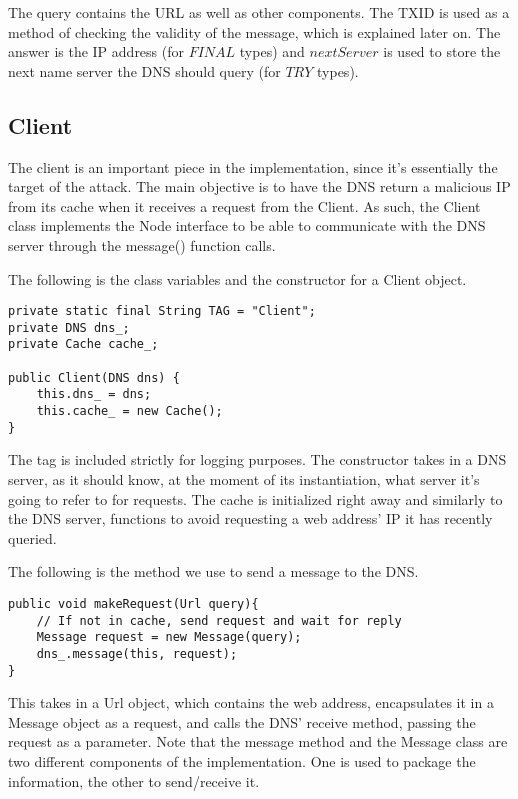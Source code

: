 \documentclass[a4paper, 12pt]{article} %
\begin{document}
The query contains the URL as well as other components. The TXID is used as a method of checking the validity of the message, which is explained later on. The answer is the IP address (for $FINAL$ types) and $nextServer$ is used to store the next name server the DNS should query (for $TRY$ types).

\subsection*{Client}

The client is an important piece in the implementation, since it's essentially the target of the attack. The main objective is to have the DNS return a malicious IP from its cache when it receives a request from the Client. As such, the Client class implements the Node interface to be able to communicate with the DNS server through the message() function calls. 

The following is the class variables and the constructor for a Client object.

\begin{lstlisting}
private static final String TAG = "Client";	
private DNS dns_;
private Cache cache_;
    	
public Client(DNS dns) {
	this.dns_ = dns;
	this.cache_ = new Cache();
}	
\end{lstlisting}

The tag is included strictly for logging purposes. The constructor takes in a DNS server, as it should know, at the moment of its instantiation, what server it's going to refer to for requests. The cache is initialized right away and similarly to the DNS server, functions to avoid requesting a web address' IP it has recently queried. 

The following is the method we use to send a message to the DNS.

\begin{lstlisting}
public void makeRequest(Url query){
	// If not in cache, send request and wait for reply
	Message request = new Message(query);
	dns_.message(this, request);
}
\end{lstlisting}

This takes in a Url object, which contains the web address, encapsulates it in a Message object as a request, and calls the DNS' receive method, passing the request as a parameter. Note that the message method and the Message class are two different components of the implementation. One is used to package the information, the other to send/receive it. 
\end{document}
